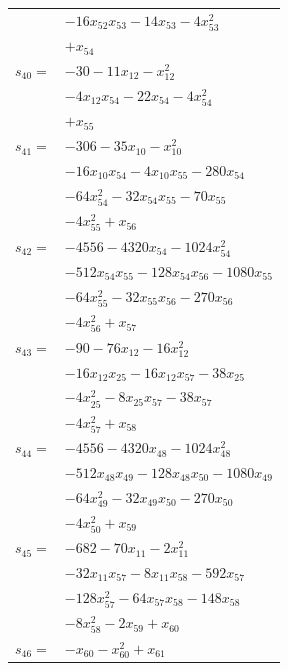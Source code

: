 \begin{longtable}{@{}r@{\;}l@{}}
 & \(\displaystyle -16x_{52}x_{53} -14x_{53} -4x_{53}^{2}\) \\
 & \(\displaystyle +x_{54}\) \\[3pt]
\(s_{40}=\) & \(\displaystyle -30 -11x_{12} -x_{12}^{2}\) \\
 & \(\displaystyle -4x_{12}x_{54} -22x_{54} -4x_{54}^{2}\) \\
 & \(\displaystyle +x_{55}\) \\[3pt]
\(s_{41}=\) & \(\displaystyle -306 -35x_{10} -x_{10}^{2}\) \\
 & \(\displaystyle -16x_{10}x_{54} -4x_{10}x_{55} -280x_{54}\) \\
 & \(\displaystyle -64x_{54}^{2} -32x_{54}x_{55} -70x_{55}\) \\
 & \(\displaystyle -4x_{55}^{2} +x_{56}\) \\[3pt]
\(s_{42}=\) & \(\displaystyle -4556 -4320x_{54} -1024x_{54}^{2}\) \\
 & \(\displaystyle -512x_{54}x_{55} -128x_{54}x_{56} -1080x_{55}\) \\
 & \(\displaystyle -64x_{55}^{2} -32x_{55}x_{56} -270x_{56}\) \\
 & \(\displaystyle -4x_{56}^{2} +x_{57}\) \\[3pt]
\(s_{43}=\) & \(\displaystyle -90 -76x_{12} -16x_{12}^{2}\) \\
 & \(\displaystyle -16x_{12}x_{25} -16x_{12}x_{57} -38x_{25}\) \\
 & \(\displaystyle -4x_{25}^{2} -8x_{25}x_{57} -38x_{57}\) \\
 & \(\displaystyle -4x_{57}^{2} +x_{58}\) \\[3pt]
\(s_{44}=\) & \(\displaystyle -4556 -4320x_{48} -1024x_{48}^{2}\) \\
 & \(\displaystyle -512x_{48}x_{49} -128x_{48}x_{50} -1080x_{49}\) \\
 & \(\displaystyle -64x_{49}^{2} -32x_{49}x_{50} -270x_{50}\) \\
 & \(\displaystyle -4x_{50}^{2} +x_{59}\) \\[3pt]
\(s_{45}=\) & \(\displaystyle -682 -70x_{11} -2x_{11}^{2}\) \\
 & \(\displaystyle -32x_{11}x_{57} -8x_{11}x_{58} -592x_{57}\) \\
 & \(\displaystyle -128x_{57}^{2} -64x_{57}x_{58} -148x_{58}\) \\
 & \(\displaystyle -8x_{58}^{2} -2x_{59} +x_{60}\) \\[3pt]
\(s_{46}=\) & \(\displaystyle -x_{60} -x_{60}^{2} +x_{61}\) \\[3pt]

\end{longtable}
